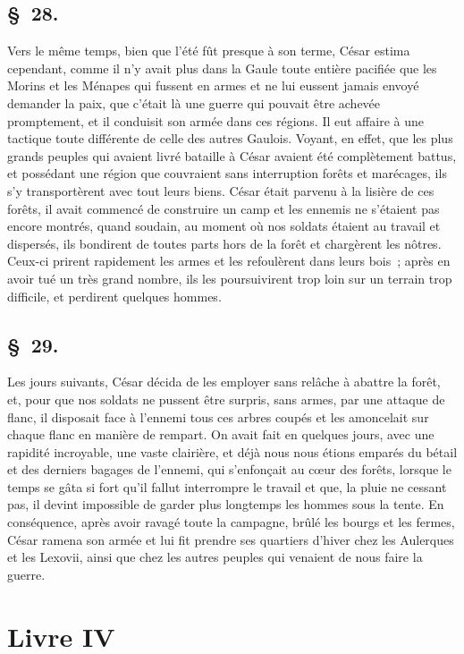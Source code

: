 \documentclass[french,twoside]{book} %
\begin{document}
\subsection[{§ 28.}]{ \textsc{§ 28.} }
\noindent Vers le même temps, bien que l’été fût presque à son terme, César estima cependant, comme il n’y avait plus dans la Gaule toute entière pacifiée que les Morins et les Ménapes qui fussent en armes et ne lui eussent jamais envoyé demander la paix, que c’était là une guerre qui pouvait être achevée promptement, et il conduisit son armée dans ces régions. Il eut affaire à une tactique toute différente de celle des autres Gaulois. Voyant, en effet, que les plus grands peuples qui avaient livré bataille à César avaient été complètement battus, et possédant une région que couvraient sans interruption forêts et marécages, ils s’y transportèrent avec tout leurs biens. César était parvenu à la lisière de ces forêts, il avait commencé de construire un camp et les ennemis ne s’étaient pas encore montrés, quand soudain, au moment où nos soldats étaient au travail et dispersés, ils bondirent de toutes parts hors de la forêt et chargèrent les nôtres. Ceux-ci prirent rapidement les armes et les refoulèrent dans leurs bois ; après en avoir tué un très grand nombre, ils les poursuivirent trop loin sur un terrain trop difficile, et perdirent quelques hommes.
\subsection[{§ 29.}]{ \textsc{§ 29.} }
\noindent Les jours suivants, César décida de les employer sans relâche à abattre la forêt, et, pour que nos soldats ne pussent être surpris, sans armes, par une attaque de flanc, il disposait face à l’ennemi tous ces arbres coupés et les amoncelait sur chaque flanc en manière de rempart. On avait fait en quelques jours, avec une rapidité incroyable, une vaste clairière, et déjà nous nous étions emparés du bétail et des derniers bagages de l’ennemi, qui s’enfonçait au cœur des forêts, lorsque le temps se gâta si fort qu’il fallut interrompre le travail et que, la pluie ne cessant pas, il devint impossible de garder plus longtemps les hommes sous la tente. En conséquence, après avoir ravagé toute la campagne, brûlé les bourgs et les fermes, César ramena son armée et lui fit prendre ses quartiers d’hiver chez les Aulerques et les Lexovii, ainsi que chez les autres peuples qui venaient de nous faire la guerre.
 \section[{Livre IV}]{Livre IV}\renewcommand{\leftmark}{Livre IV}
\end{document}
